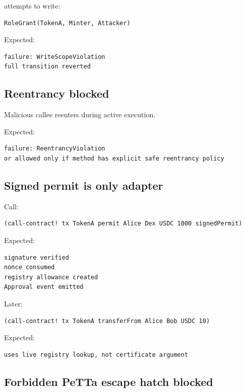  attempts to write:

\begin{lstlisting}
RoleGrant(TokenA, Minter, Attacker)
\end{lstlisting}

Expected:

\begin{lstlisting}
failure: WriteScopeViolation
full transition reverted
\end{lstlisting}

\subsection{Reentrancy blocked}

Malicious callee reenters  during active execution.

Expected:

\begin{lstlisting}
failure: ReentrancyViolation
or allowed only if method has explicit safe reentrancy policy
\end{lstlisting}

\subsection{Signed permit is only adapter}

Call:

\begin{lstlisting}
(call-contract! tx TokenA permit Alice Dex USDC 1000 signedPermit)
\end{lstlisting}

Expected:

\begin{lstlisting}
signature verified
nonce consumed
registry allowance created
Approval event emitted
\end{lstlisting}

Later:

\begin{lstlisting}
(call-contract! tx TokenA transferFrom Alice Bob USDC 10)
\end{lstlisting}

Expected:

\begin{lstlisting}
uses live registry lookup, not certificate argument
\end{lstlisting}

\subsection{Forbidden PeTTa escape hatch blocked}

